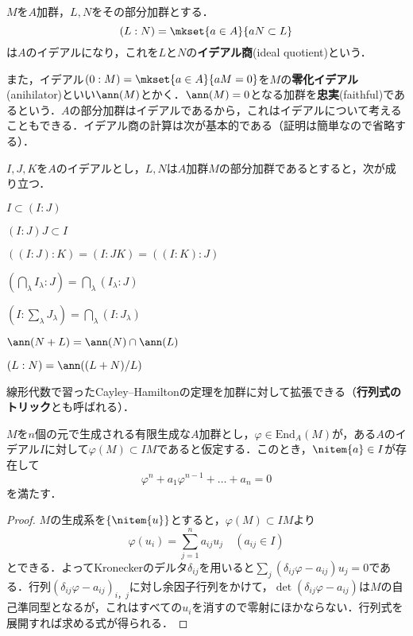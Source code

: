 \begin{defi}[イデアル商]\label{defi:イデアル商}
	$M$を$A$加群，$L,N$をその部分加群とする．
	\[(L:N)=\mkset{a\in A}{aN\subset L}\]
	は$A$のイデアルになり，これを$L$と$N$の\textbf{イデアル商}(ideal quotient)という．
\end{defi}

また，イデアル$(0:M)=\mkset{a\in A}{aM=0}$を$M$の\textbf{零化イデアル}(anihilator)といい$\ann(M)$とかく．$\ann(M)=0$となる加群を\textbf{忠実}(faithful)であるという．$A$の部分加群はイデアルであるから，これはイデアルについて考えることもできる．イデアル商の計算は次が基本的である（証明は簡単なので省略する）．

\begin{prop}\label{prop:加群商}
	$I,J,K$を$A$のイデアルとし，$L,N$は$A$加群$M$の部分加群であるとすると，次が成り立つ．
	\begin{sakura}
		\item $I\subset(I:J)$
		\item $(I:J)J\subset I$
		\item $((I:J):K)=(I:JK)=((I:K):J)$
		\item $(\bigcap_\lambda I_\lambda:J)=\bigcap_\lambda (I_\lambda:J)$
		\item $(I:\sum_\lambda J_\lambda)=\bigcap_\lambda (I:J_\lambda)$
		\item $\ann (N+L)=\ann (N)\cap\ann (L)$
		\item $(L:N)=\ann((L+N)/L)$
	\end{sakura}
\end{prop}

線形代数で習ったCayley--Hamiltonの定理を加群に対して拡張できる（\textbf{行列式のトリック}とも呼ばれる）．
\begin{thm}
	\label{thm:Cayley-Hamilton}
	$M$を$n$個の元で生成される有限生成な$A$加群とし，$\varphi\in\text{End}_A(M)$が，ある$A$のイデアル$I$に対して$\varphi(M)\subset IM$であると仮定する．このとき，$\nitem{a}\in I$が存在して
	\[\varphi^n+a_1\varphi^{n-1}+\dots+a_n=0\]
	を満たす．
\end{thm}
\begin{proof}
	$M$の生成系を$\{\nitem{u}\}$とすると，$\varphi(M)\subset IM$より
	\[\varphi(u_i)=\sum_{j=1}^n a_{ij}u_j\quad(a_{ij}\in I)\]
	とできる．よってKroneckerのデルタ$\delta_{ij}$を用いると$\sum_j(\delta_{ij}\varphi-a_{ij})u_j=0$である．行列$(\delta_{ij}\varphi-a_{ij})_{i，j}$に対し余因子行列をかけて，$\det(\delta_{ij}\varphi-a_{ij})$は$M$の自己準同型となるが，これはすべての$u_i$を消すので零射にほかならない．行列式を展開すれば求める式が得られる．
\end{proof}

